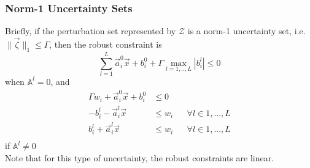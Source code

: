 \subsubsection{Norm-1 Uncertainty Sets}
Briefly, if the perturbation set represented by $\mathcal{Z}$ is a norm-1 uncertainty set, i.e. $\|\vec{\zeta}\|_1 \leq \Gamma$,
then the robust constraint is
\begin{equation}
\textstyle{\sum}_{l=1}^L \vec{a}^0_{i}\vec{x} + b^0_{i} + \Gamma \max_{l=1,..,L} |b^l_{i}| \leq 0
\label{rom_coeff}
\end{equation}
when $\mathbb{A}^l = 0$, and 
\begin{equation}
\begin{aligned}
\Gamma w_{i} + \vec{a}^0_{i}\vec{x} + b^0_{i} &\leq 0\\
- b^l_{i} - \vec{a}^l_{i}\vec{x} &\leq w_{i} &&\forall l \in 1,...,L\\
b^l_{i} + \vec{a}^l_{i}\vec{x} &\leq w_{i} &&\forall l \in 1,...,L\\
\end{aligned}
\label{rom_linear}
\end{equation}
if $\mathbb{A}^l \neq 0$\\
Note that for this type of uncertainty, the robust constraints are linear.
